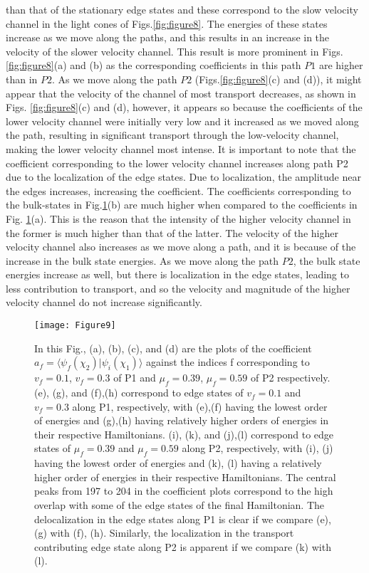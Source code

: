 \documentclass[aps,pra,reprint,superscriptaddress,longbibliography]{revtex4-2}
\begin{document}
than that of the stationary edge states and these correspond to the slow velocity channel in the light cones of Figs.\ref{fig:figure8}. The energies of these states increase as we move along the paths, and this results in an increase in the velocity of the slower velocity channel. This result is more prominent in Figs.\ref{fig:figure8}(a) and (b) as the corresponding coefficients in this path $ P1 $ are higher than in $ P2 $. As we move along the path $P2$ (Figs.\ref{fig:figure8}(c) and (d)), it might appear that the velocity of the channel of most transport decreases, as shown in Figs. \ref{fig:figure8}(c) and (d), however, it appears so because the coefficients of the lower velocity channel were initially very low and it increased as we moved along the path, resulting in significant transport through the low-velocity channel, making the lower velocity channel most intense. It is important to note that the coefficient corresponding to the lower velocity channel increases along path P2 due to the localization of the edge states. Due to localization, the amplitude near the edges increases, increasing the coefficient. 
 The coefficients corresponding to the bulk-states in Fig.\ref{fig:figure9}(b) are much higher when compared to the coefficients in Fig. \ref{fig:figure9}(a). This is the reason that the intensity of the higher velocity channel in the former is much higher than that of the latter. The velocity of the higher velocity channel also increases as we move along a path, and it is because of the increase in the bulk state energies. As we move along the path $ P2 $, the bulk state energies increase as well, but there is localization in the edge states, leading to less contribution to transport, and so the velocity and magnitude of the higher velocity channel do not increase significantly.
 
\begin{figure}
	\centering
	\texttt{[image: Figure9]}
	\caption{In this Fig., (a), (b), (c), and (d) are the plots of the coefficient $  a_f=\langle \psi_f(\chi_2)|\psi_i(\chi_1)\rangle  $ against the indices f corresponding to $ v_{f} = 0.1 $, $ v_{f}=0.3 $ of P1 and $ \mu_{f}=0.39 $, $ \mu_{f}=0.59 $ of P2 respectively. (e), (g), and (f),(h) correspond to edge states of $ v_{f} = 0.1 $ and $ v_{f} = 0.3 $ along P1, respectively, with (e),(f) having the lowest order of energies and (g),(h) having relatively higher orders of energies in their respective Hamiltonians. (i), (k), and (j),(l) correspond to edge states of $ \mu_{f} = 0.39 $ and $ \mu_{f} = 0.59 $ along P2, respectively, with (i), (j) having the lowest order of energies and (k), (l) having a relatively higher order of energies in their respective Hamiltonians.
		 The central peaks from 197 to 204 in the coefficient plots correspond to the high overlap with some of the edge states of the final Hamiltonian. The delocalization in the edge states along P1 is clear if we compare (e), (g) with (f), (h). Similarly, the localization in the transport contributing edge state along P2 is apparent if we compare (k) with (l).}
	\label{fig:figure9}
	\vspace{-0.5cm}
\end{figure}
  
\end{document}
